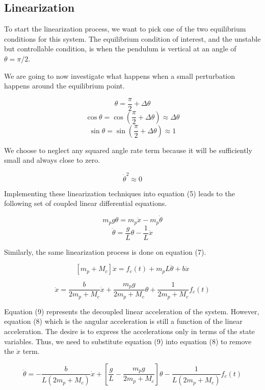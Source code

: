 \documentclass[titlepage]{article}
\begin{document}
\subsection{Linearization}

To start the linearization process, we want to pick one of the two equilibrium conditions for this system. The equilibrium condition of interest, and the unstable but controllable condition, is when the pendulum is vertical at an angle of \(\theta = \pi / 2\).

We are going to now investigate what happens when a small perturbation happens around the equilibrium point.

\[\theta = \frac{\pi}{2} + \Delta\theta\]
\[\cos{\theta} = \cos{\left(\frac{\pi}{2} + \Delta\theta\right)} \approx \Delta\theta\]
\[\sin{\theta} = \sin{\left(\frac{\pi}{2} + \Delta\theta\right)} \approx 1\]

We choose to neglect any squared angle rate term because it will be sufficiently small and always close to zero.

\[\dot{\theta}^{2} \approx 0\]

Implementing these linearization techniques into equation (5) leads to the following set of coupled linear differential equations.

\[m_{p}g\theta = m_{p}\ddot{x} - m_{p}\ddot{\theta}\]
\begin{equation}
\ddot{\theta} = \frac{g}{L}\theta - \frac{1}{L}\ddot{x}
\end{equation}

Similarly, the same linearization process is done on equation (7).

\[\left[m_{p} + M_{c}\right] \ddot{x} = f_{c}\left(t\right) + m_{p}L\ddot{\theta} + b\dot{x}\]

\begin{equation}
\ddot{x} = \frac{b}{2m_{p} + M_{c}}\dot{x} + \frac{m_{p}g}{2m_{p} + M_{c}}\theta + \frac{1}{2m_{p} + M_{c}}f_{c}\left(t\right)
\end{equation}

Equation (9) represents the decoupled linear acceleration of the system. However, equation (8) which is the angular acceleration is still a function of the linear acceleration.
The desire is to express the accelerations only in terms of the state variables. Thus, we need to substitute equation (9) into equation (8) to remove the \(\ddot{x}\) term.

\begin{equation}
\ddot{\theta} = -\frac{b}{L\left(2m_{p} + M_{c}\right)}\dot{x} + \left[\frac{g}{L} - \frac{m_{p}g}{2m_{p} + M_{c}}\right]\theta - \frac{1}{L\left(2m_{p} + M_{c}\right)}f_{c}\left(t\right)
\end{equation}
\end{document}
